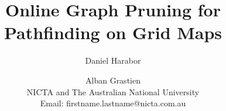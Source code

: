 \documentclass{article}
\begin{document}
\title{Online Graph Pruning for Pathfinding on Grid Maps}
\author{
Daniel Harabor 
\and 
Alban Grastien \\
NICTA and The Australian National University \\
Email: firstname.lastname@nicta.com.au
}

\maketitle














\end{document}

